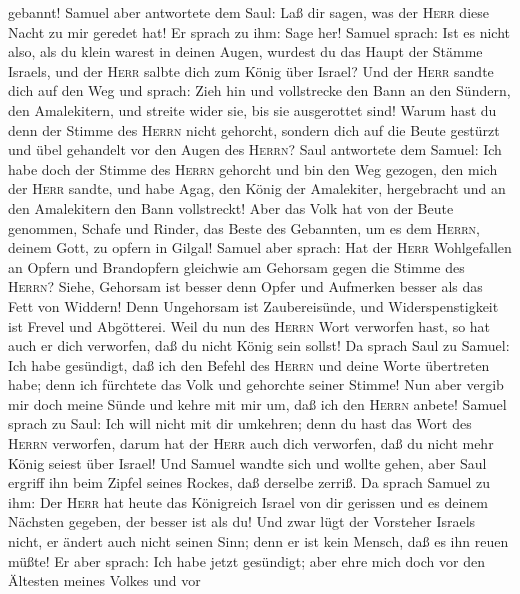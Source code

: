 gebannt!  Samuel aber antwortete dem Saul: Laß dir sagen,
was der \textsc{Herr} diese Nacht zu mir geredet hat! Er sprach zu ihm:
Sage her!  Samuel sprach: Ist es nicht also, als du klein
warest in deinen Augen, wurdest du das Haupt der Stämme Israels, und der
\textsc{Herr} salbte dich zum König über Israel?  Und der
\textsc{Herr} sandte dich auf den Weg und sprach: Zieh hin und
vollstrecke den Bann an den Sündern, den Amalekitern, und streite wider
sie, bis sie ausgerottet sind!  Warum hast du denn der
Stimme des \textsc{Herrn} nicht gehorcht, sondern dich auf die Beute
gestürzt und übel gehandelt vor den Augen des \textsc{Herrn}?
 Saul antwortete dem Samuel: Ich habe doch der Stimme des
\textsc{Herrn} gehorcht und bin den Weg gezogen, den mich der
\textsc{Herr} sandte, und habe Agag, den König der Amalekiter,
hergebracht und an den Amalekitern den Bann vollstreckt! 
Aber das Volk hat von der Beute genommen, Schafe und Rinder, das Beste
des Gebannten, um es dem \textsc{Herrn}, deinem Gott, zu opfern in
Gilgal!  Samuel aber sprach: Hat der \textsc{Herr}
Wohlgefallen an Opfern und Brandopfern gleichwie am Gehorsam gegen die
Stimme des \textsc{Herrn}? Siehe, Gehorsam ist besser denn Opfer und
Aufmerken besser als das Fett von Widdern!  Denn
Ungehorsam ist Zaubereisünde, und Widerspenstigkeit ist Frevel und
Abgötterei. Weil du nun des \textsc{Herrn} Wort verworfen hast, so hat
auch er dich verworfen, daß du nicht König sein sollst! 
Da sprach Saul zu Samuel: Ich habe gesündigt, daß ich den Befehl des
\textsc{Herrn} und deine Worte übertreten habe; denn ich fürchtete das
Volk und gehorchte seiner Stimme!  Nun aber vergib mir
doch meine Sünde und kehre mit mir um, daß ich den \textsc{Herrn}
anbete!  Samuel sprach zu Saul: Ich will nicht mit dir
umkehren; denn du hast das Wort des \textsc{Herrn} verworfen, darum hat
der \textsc{Herr} auch dich verworfen, daß du nicht mehr König seiest
über Israel!  Und Samuel wandte sich und wollte gehen,
aber Saul ergriff ihn beim Zipfel seines Rockes, daß derselbe zerriß.
 Da sprach Samuel zu ihm: Der \textsc{Herr} hat heute das
Königreich Israel von dir gerissen und es deinem Nächsten gegeben, der
besser ist als du!  Und zwar lügt der Vorsteher Israels
nicht, er ändert auch nicht seinen Sinn; denn er ist kein Mensch, daß es
ihn reuen müßte!  Er aber sprach: Ich habe jetzt
gesündigt; aber ehre mich doch vor den Ältesten meines Volkes und vor
